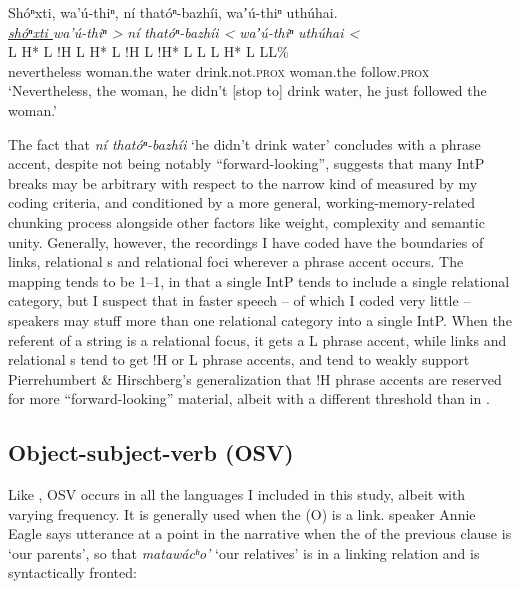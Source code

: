 \documentclass[output=paper]{LSP/langsci}
\begin{document}
\ea\label{wolfeintp}
 	Shóⁿxti, wa’ú-thiⁿ, ní thatóⁿ-bazhíi, waʼú-thiⁿ uthúhai.\footnotemark\\
\glll	\emph{\underline{shóⁿxti }}	\emph{wa’ú-thiⁿ >}		\emph{ní} 		\emph{thatóⁿ-bazhíi <}		\emph{waʼú-thiⁿ} 	\emph{uthúhai <}\\
	{\ob L H* L !H\cb}			{\ob L H* L !H\cb}		{\ob L}		{!H* L L\cb}	{\ob L H* L}		{L\cb{}L\%}\\
	nevertheless				woman.the			water			drink.not.\textsc{prox} 		woman.the		follow.\textsc{prox}\\
\glt	`Nevertheless, the woman, he didn’t [stop to] drink water, he just followed the woman.' 
\z

The fact that \emph{ní thatóⁿ-bazhíi} `he didn’t drink water' concludes with a phrase accent, despite not being notably “forward-looking”, suggests that many IntP breaks may be arbitrary with respect to the narrow kind of  measured by my coding criteria, and conditioned by a more general, working-memory-related chunking process alongside other factors like weight, complexity and semantic unity. Generally, however, the recordings I have coded have the boundaries of links, relational s and relational foci wherever a phrase accent occurs. The mapping tends to be 1--1, in that a single IntP tends to include a single relational category, but I suspect that in faster speech -- of which I coded very little -- speakers may stuff more than one relational category into a single IntP. When the referent of a string is a relational focus, it gets a L phrase accent, while links and relational s tend to get !H or L phrase accents, and tend to weakly support Pierrehumbert \& Hirschberg’s \citeyearpar{PierrehumbertHirschberg1990} generalization that !H phrase accents are reserved for more “forward-looking” material, albeit with a different threshold than in .

\subsection{Object-subject-verb (OSV) }\label{osv}

Like , OSV  occurs in all the languages I included in this study, albeit with varying frequency. It is generally used when the  (O) is a link.  speaker Annie Eagle says utterance  at a point in the narrative when the  of the previous clause is `our parents', so that \emph{matawácʰo’} `our relatives' is in a linking relation and is syntactically fronted:
\end{document}
